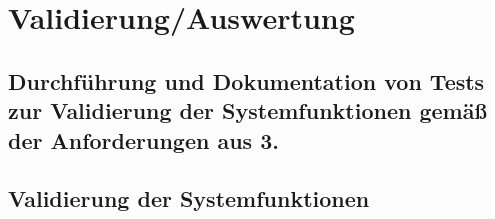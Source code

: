 \chapter{Validierung/Auswertung}
\section{Durchführung und Dokumentation von Tests zur Validierung der Systemfunktionen gemäß der Anforderungen aus 3.}
\section{Validierung der Systemfunktionen}